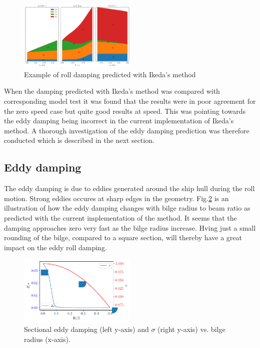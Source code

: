     

    \begin{figure}[H]
        \begin{center}\includegraphics[width = 0.5\textwidth]{figures/ikeda_generic.pdf}\end{center}
        \vspace{-1cm}
        \caption{Example of roll damping predicted with Ikeda's method}
        \label{fig:ikeda_generic}
    \end{figure}
    
    When the damping predicted with Ikeda's method was compared with
corresponding model test it was found that the results were in poor
agreement for the zero speed case but quite good results at speed. This
was pointing towards the eddy damping being incorrect in the current
implementation of Ikeda's method. A thorough investigation of the eddy
damping prediction was therefore conducted which is described in the
next section.

    \subsection*{Eddy damping}\label{eddy-damping}

The eddy damping is due to eddies generated around the ship hull during
the roll motion. Strong eddies occures at sharp edges in the geometry.
Fig.\ref{fig:eddy_sigma} is an illustration of how the eddy
damping changes with bilge radius to beam ratio as predicted with the
current implementation of the method. It seems that the damping
approaches zero very fast as the bilge radius increase. Hving just a
small rounding of the bilge, compared to a square section, will thereby
have a great impact on the eddy roll damping.

    

    \begin{figure}[H]
        \begin{center}\includegraphics[width = 0.5\textwidth]{figures/eddy_sigma.pdf}\end{center}
        \vspace{-1cm}
        \caption{Sectional eddy damping (left y-axis) and $\sigma$ (right y-axis) vs. bilge radius (x-axis).}
        \label{fig:eddy_sigma}
    \end{figure}
    
